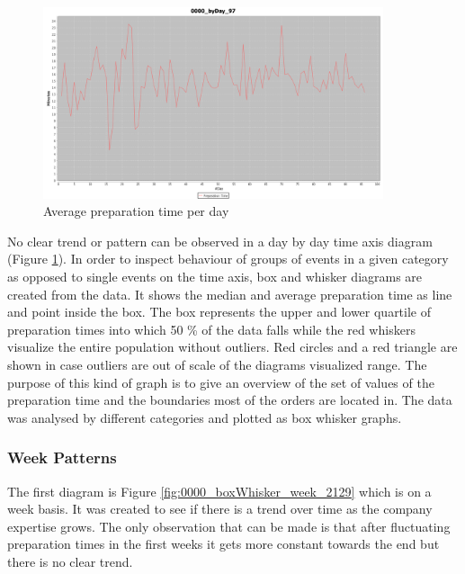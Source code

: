 \begin{figure}[h]
\begin{center}
\includegraphics[width=10cm]{images/0000_byDay_97.png}
\caption{Average preparation time per day}
\label{fig:0000_byDay_97}
\end{center}
\end{figure}


No clear trend or pattern can be observed in a day by day time axis diagram (Figure \ref{fig:0000_byDay_97}). In order to inspect behaviour of groups of events in a given category as opposed to single events on the time axis, box and whisker diagrams are created from the data. It shows the median and average preparation time as line and point inside the box. The box represents the upper and lower quartile of preparation times into which 50 \% of the data falls while the red whiskers visualize the entire population without outliers. Red circles and a red triangle are shown in case outliers are out of scale of the diagrams visualized range. The purpose of this kind of graph is to give an overview of the set of values of the preparation time and the boundaries most of the orders are located in. The data was analysed by different categories and plotted as box whisker graphs.\newline
\subsubsection{Week Patterns}
The first diagram is Figure \ref{fig:0000_boxWhisker_week_2129} which is on a week basis. It was created to see if there is a trend over time as the company expertise grows. The only observation that can be made is that after fluctuating preparation times in the first weeks it gets more constant towards the end but there is no clear trend.

